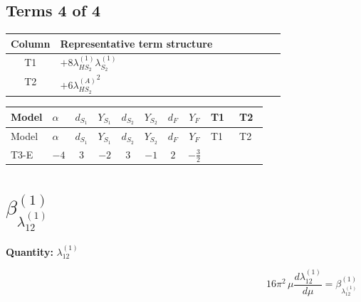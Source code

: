 \documentclass[8pt]{article}
\begin{document}
\begin{landscape}
\subsection*{Terms 4 of 4}
\begin{center}
\begin{tabular}{@{}c >{\raggedright\arraybackslash}p{0.82\linewidth}@{}}
\toprule
Column & Representative term structure \\
\midrule
T1 & \(\displaystyle +8 {\lambda_{HS_2}^{(1)}} {\lambda_{S_2}^{(1)}}\) \\
\midrule
T2 & \(\displaystyle +6 {\lambda_{HS_2}^{(A)}}^2\) \\
\midrule
\bottomrule
\end{tabular}
\end{center}
\smallskip
\tiny
\begin{longtable}{@{}llcccccc >{\raggedright\arraybackslash}p{0.21\linewidth} >{\raggedright\arraybackslash}p{0.21\linewidth}@{}}
\toprule
Model & $\alpha$ & $d_{S_1}$ & $Y_{S_1}$ & $d_{S_2}$ & $Y_{S_2}$ & $d_F$ & $Y_F$ & T1 & T2 \\
\midrule
\endfirsthead
\toprule
Model & $\alpha$ & $d_{S_1}$ & $Y_{S_1}$ & $d_{S_2}$ & $Y_{S_2}$ & $d_F$ & $Y_F$ & T1 & T2 \\
\midrule
\endhead
T3-E & $-4$ & $3$ & $-2$ & $3$ & $-1$ & $2$ & $-\frac{3}{2}$ & \scriptsize\adjustbox{max width=\linewidth}{$\begin{gathered} +8 {\lambda_{HS_2}^{(1)}} {\lambda_{S_2}^{(1)}}\end{gathered}$} & \scriptsize\adjustbox{max width=\linewidth}{$\begin{gathered} +6 {\lambda_{HS_2}^{(A)}}^2\end{gathered}$} \\
\midrule
\bottomrule
\end{longtable}
\clearpage
\section*{$\beta_{\lambda_{12}^{(1)}}^{(1)}$}
\noindent\textbf{Quantity: }$\lambda_{12}^{(1)}$\par\smallskip
\[16\pi^2\,\mu\frac{d \lambda_{12}^{(1)}}{d\mu}=\beta_{\lambda_{12}^{(1)}}^{(1)}\]

\end{landscape}
\end{document}
